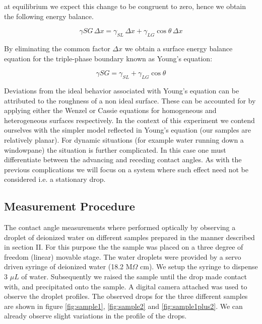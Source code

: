 at equilibrium we expect this change to be congruent to zero, hence we obtain the following energy balance.

\begin{equation}
\gamma{SG} \, \Delta x = \gamma_{SL} \, \Delta x + \gamma_{LG} \cos{\theta}\, \Delta x
\end{equation}

By eliminating the common factor $\Delta x$ we obtain a surface energy balance equation for the triple-phase boundary known as Young's equation:

\begin{equation}
\gamma{SG} = \gamma_{SL} + \gamma_{LG} \cos{\theta}
\end{equation}

Deviations from the ideal behavior associated with Young's equation can be attributed to the roughness of a non ideal surface. These can be accounted for by applying either the Wenzel or Cassie equations for homogeneous and heterogeneous surfaces respectively. In the context of this experiment we contend ourselves with the simpler model reflected in Young's equation (our samples are relatively planar).
For dynamic situations (for example water running down a windowpane) the situation is further complicated. In this case one must differentiate between the advancing and receding contact angles. As with the previous complications we will focus on a system where such effect need not be considered i.e. a stationary drop.

\subsection{Measurement Procedure}

The contact angle measurements where performed optically by observing a droplet of deionized water on different samples prepared in the manner described in section II. For this purpose the the sample was placed on a three degree of freedom (linear) movable stage. The water droplets were provided by a servo driven syringe of deionized water (18.2 M$\Omega$ cm). 
We setup the syringe to dispense 3 $\mu L$ of water. Subsequently we raised the sample until the drop made contact with, and precipitated onto the sample. A digital camera attached was used to observe the droplet profiles.
The observed drops for the three different samples are shown in figure \ref{fig:sample1}, \ref{fig:sample2} and \ref{fig:sample1plus2}. We can already observe slight variations in the profile of the drops.


